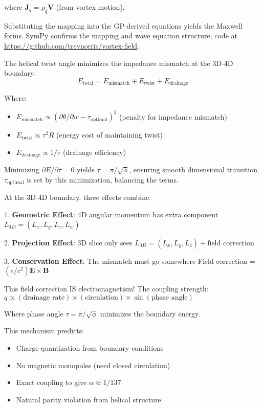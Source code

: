 where $\mathbf{J}_q = \rho_q \mathbf{V}$ (from vortex motion).

Substituting the mapping into the GP-derived equations yields the Maxwell forms. SymPy confirms the mapping and wave equation structure; code at \url{https://github.com/trevnorris/vortex-field}.

The helical twist angle minimizes the impedance mismatch at the 3D-4D boundary:
\begin{equation}
E_{\text{total}} = E_{\text{mismatch}} + E_{\text{twist}} + E_{\text{drainage}}
\end{equation}

Where:
\begin{itemize}
\item $E_{\text{mismatch}} \propto (\partial \theta / \partial w - \tau_{\text{optimal}})^2$  (penalty for impedance mismatch)
\item $E_{\text{twist}} \propto \tau^2 R$  (energy cost of maintaining twist)
\item $E_{\text{drainage}} \propto 1/\tau$  (drainage efficiency)
\end{itemize}

Minimizing $\partial E / \partial \tau = 0$ yields $\tau = \pi/\sqrt{\phi}$, ensuring smooth dimensional transition. $\tau_{\text{optimal}}$ is set by this minimization, balancing the terms.

At the 3D-4D boundary, three effects combine:

1. \textbf{Geometric Effect}: 4D angular momentum has extra component
   $L_{4D} = (L_x, L_y, L_z, L_w)$
   
2. \textbf{Projection Effect}: 3D slice only sees
   $L_{3D} = (L_x, L_y, L_z) + \text{field correction}$
   
3. \textbf{Conservation Effect}: The mismatch must go somewhere
   Field correction = $(e/c^2) \mathbf{E} \times \mathbf{B}$

This field correction IS electromagnetism! The coupling strength:
$q \propto (\text{drainage rate}) \times (\text{circulation}) \times \sin(\text{phase angle})$

Where phase angle $\tau = \pi/\sqrt{\phi}$ minimizes the boundary energy.

This mechanism predicts:
\begin{itemize}
\item Charge quantization from boundary conditions
\item No magnetic monopoles (need closed circulation)
\item Exact coupling to give $\alpha \approx 1/137$
\item Natural parity violation from helical structure
\end{itemize}

